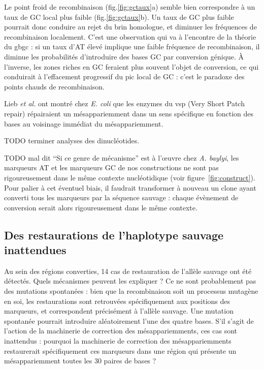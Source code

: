 Le point froid de recombinaison (fig.\ref{fig:gctaux}a) semble bien correspondre
à un taux de GC local plus faible (fig.\ref{fig:gctaux}b). Un taux de GC plus
faible pourrait donc conduire au rejet du brin homologue, et diminuer les
fréquences de recombinaison localement. C'est une observation qui va à
l'encontre de la théorie du \ac{gbgc} : si un taux d'AT élevé implique une
faible fréquence de recombinaison, il diminue les probabilités d'introduire des
bases GC par conversion génique. À l'inverse, les zones riches en GC feraient
plus souvent l'objet de conversion, ce qui conduirait à l'effacement progressif
du pic local de GC : c'est le paradoxe des points chauds de
recombinaison\cite{coop_live_2007}.

Lieb \emph{et al.}\cite{lieb_recombination_1985} ont montré chez \emph{E. coli}
que les enzymes du \ac{vsp} (Very Short Patch repair) répairaient un
mésappariemment dans un sens spécifique en fonction des bases au voisinage
immédiat du mésappariemment.

TODO terminer analyses des dinucléotides.

TODO mal dit ``Si ce genre de mécanisme'' est à l'œuvre chez \emph{A. baylyi},
les marqueurs AT et les marqueurs GC de nos constructions ne sont pas
rigoureusement dans le même contexte nucléotidique (voir
figure~\ref{fig:construct}). Pour palier à cet éventuel biais, il faudrait
transformer à nouveau un clone ayant converti tous les marqueurs par la séquence
sauvage : chaque évènement de conversion serait alors rigoureusement dans le
même contexte.

\subsection{Des restaurations de l'haplotype sauvage inattendues}
\label{subsub:discu-restaur}

Au sein des régions converties, 14 cas de restauration de l'allèle sauvage ont
été détectés. Quels mécanismes peuvent les expliquer ? Ce ne sont probablement
pas des mutations spontanées : bien que la recombinaison soit un processus
mutagène en soi\cite{rodgers_error-prone_2016,hicks_increased_2010}, les
restaurations sont retrouvées spécifiquement aux positions des marqueurs, et
correspondent précisément à l'allèle sauvage. Une mutation spontanée pourrait
introduire aléatoirement l'une des quatre bases. S'il s'agit de l'action de la
machinerie de correction des mésappariemments, ces cas sont inattendus :
pourquoi la machinerie de correction des mésappariemments restaurerait
spécifiquement ces marqueurs dans une région qui présente un mésappariemment
toutes les 30 paires de bases ?

